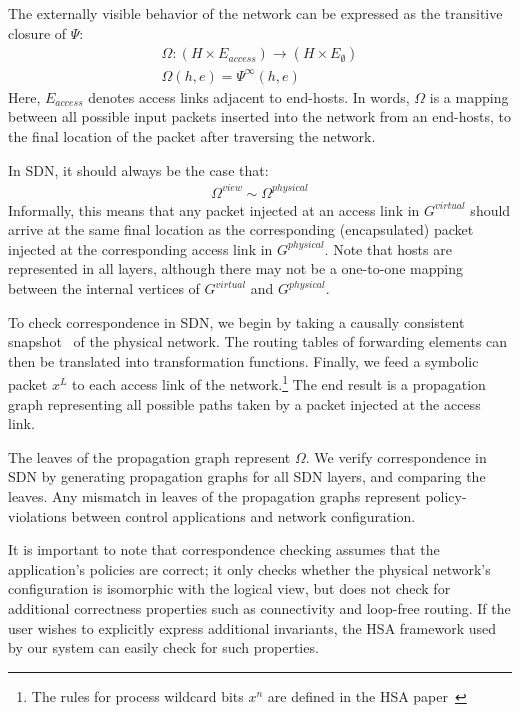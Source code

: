 The externally visible behavior of the network can be expressed as the
transitive closure of $\Psi$:
\begin{align*}
\Omega: (H \times E_{access}) \rightarrow (H \times E_{\emptyset}) \\
\Omega(h,e) = \Psi^{\infty}(h,e)
\end{align*}
Here, $E_{access}$ denotes access links adjacent to end-hosts.
In words, $\Omega$ is a mapping between all possible input packets inserted
into the network from an end-hosts, to the final location of the packet after
traversing the network.

In SDN, it should always be the case that:
\begin{align*}
\Omega^{view} \sim \Omega^{physical}
\end{align*}
Informally, this means that any packet injected at an access link in $G^{virtual}$ should arrive at
the same final location as the corresponding (encapsulated) packet injected at the
corresponding access link in $G^{physical}$. Note that hosts are represented
in all layers, although there may not be a one-to-one mapping between the
internal vertices of $G^{virtual}$ and $G^{physical}$.

To check correspondence in SDN, we begin by taking a causally consistent
snapshot~\cite{Chandy:1985:DSD:214451.214456} of the physical network. The routing
tables of forwarding elements can then be translated into transformation functions.
Finally, we feed a symbolic packet $x^L$ to each access link of the
network.\footnote{The rules for process wildcard bits $x^n$ are defined in
the HSA paper~\cite{hsa}} The end result is a propagation graph representing all possible paths taken by a packet injected
at the access link.

The leaves of the propagation graph represent $\Omega$. We
verify correspondence in SDN by generating propagation graphs for all SDN layers,
and comparing the leaves. Any mismatch in leaves of the propagation graphs
represent policy-violations between control applications and network
configuration.

It is important to note that correspondence checking assumes that the
application's policies are correct; it only checks whether the physical
network's configuration is isomorphic with the logical view, but does not
check for additional correctness properties such as connectivity and
loop-free routing. If the user wishes to explicitly express additional
invariants, the HSA framework used by our system can
easily check for such properties.

